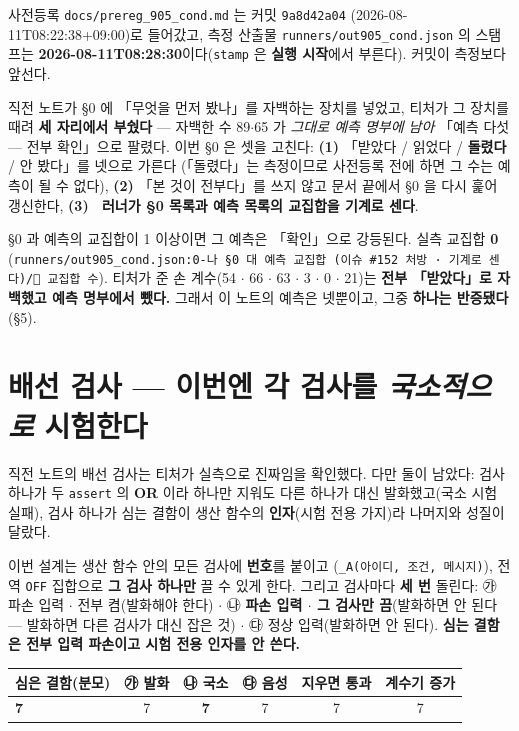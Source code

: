 \documentclass{article}
\begin{document}
사전등록 \texttt{docs/prereg\_905\_cond.md} 는 커밋 \texttt{9a8d42a04}
(2026-08-11T08:22:38+09:00)로 들어갔고, 측정 산출물 \texttt{runners/out905\_cond.json} 의
스탬프는 \textbf{2026-08-11T08:28:30}이다(\texttt{stamp} 은 \textbf{실행 시작}에서 부른다).
커밋이 측정보다 앞선다.

직전 노트가 \S 0 에 「무엇을 먼저 봤나」를 자백하는 장치를 넣었고, 티처가 그 장치를
때려 \textbf{세 자리에서 부쉈다} --- 자백한 수 89$\cdot$65 가 \emph{그대로 예측 명부에
남아} 「예측 다섯 --- 전부 확인」으로 팔렸다. 이번 \S 0 은 셋을 고친다:
\textbf{(1)} 「받았다 / 읽었다 / \textbf{돌렸다} / 안 봤다」를 넷으로 가른다
(「돌렸다」는 측정이므로 사전등록 전에 하면 그 수는 예측이 될 수 없다),
\textbf{(2)} 「본 것이 전부다」를 쓰지 않고 문서 끝에서 \S 0 을 다시 훑어 갱신한다,
\textbf{(3)} 🔴 \textbf{러너가 \S 0 목록과 예측 목록의 교집합을 기계로 센다}.

{\S 0 과 예측의 교집합이 1 이상이면 그 예측은 「확인」으로 강등된다. 실측 교집합
\textbf{0} (\texttt{runners/out905\_cond.json:0-나 \S 0 대 예측 교집합 (이슈 \#152 처방 · 기계로 센다)/🔴 교집합 수}).}
티처가 준 손 계수(54 $\cdot$ 66 $\cdot$ 63 $\cdot$ 3 $\cdot$ 0 $\cdot$ 21)는
\textbf{전부 「받았다」로 자백했고 예측 명부에서 뺐다.} 그래서 이 노트의 예측은 넷뿐이고,
그중 \textbf{하나는 반증됐다}(\S 5).

\section{배선 검사 --- 이번엔 각 검사를 \emph{국소적으로} 시험한다}

직전 노트의 배선 검사는 티처가 실측으로 진짜임을 확인했다. 다만 둘이 남았다:
검사 하나가 두 \texttt{assert} 의 \textbf{OR} 이라 하나만 지워도 다른 하나가 대신
발화했고(국소 시험 실패), 검사 하나가 심는 결함이 생산 함수의 \textbf{인자}(시험 전용
가지)라 나머지와 성질이 달랐다.

이번 설계는 생산 함수 안의 모든 검사에 \textbf{번호}를 붙이고
(\texttt{\_A(아이디, 조건, 메시지)}), 전역 \texttt{OFF} 집합으로 \textbf{그 검사 하나만}
끌 수 있게 한다. 그리고 검사마다 \textbf{세 번} 돌린다:
㉮ 파손 입력 $\cdot$ 전부 켬(발화해야 한다) $\cdot$
㉯ \textbf{파손 입력 $\cdot$ 그 검사만 끔}(발화하면 안 된다 --- 발화하면 다른 검사가 대신 잡은 것) $\cdot$
㉰ 정상 입력(발화하면 안 된다). \textbf{심는 결함은 전부 입력 파손이고 시험 전용 인자를 안 쓴다.}

\begin{center}
\begin{tabular}{lccccc}
\toprule
심은 결함(분모) & ㉮ 발화 & \textbf{㉯ 국소} & ㉰ 음성 & 지우면 통과 & 계수기 증가 \\
\midrule
\textbf{7} & 7 & \textbf{7} & 7 & 7 & 7 \\
\bottomrule
\end{tabular}
\end{center}
\end{document}
